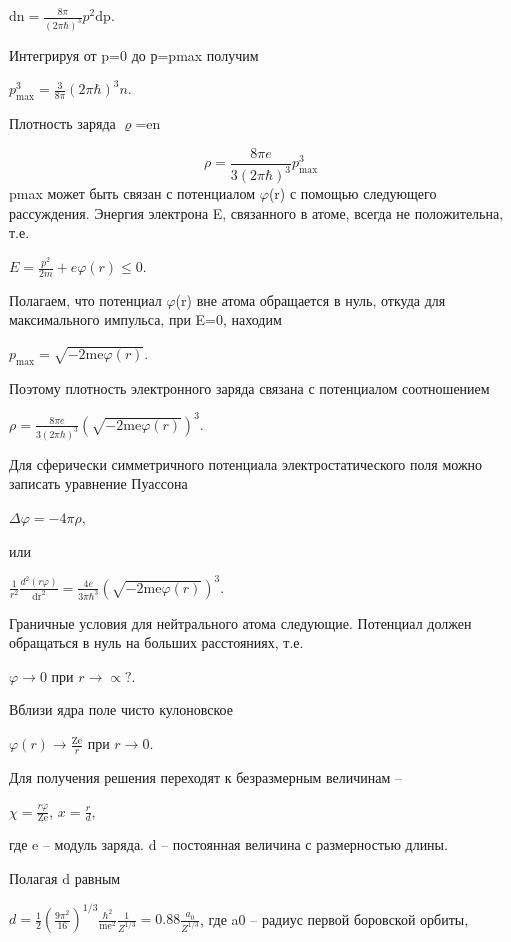 \documentclass[a4paper,14pt, openany, twoside, draft]{extbook} %
\begin{document}
 ${\text{dn}}=\frac{8\pi }{(2\pi \hbar )^3}p^2{\text{dp}}$.

Интегрируя от p=0 до р=pmax получим

 $p_{\text{max}}^3=\frac 3{8\pi }(2\pi \hbar )^3n$.

Плотность заряда ${\varrho}$=en

\begin{equation*}
\rho =\frac{8\mathit{\pi e}}{3(2\pi \hbar )^3}p_{\text{max}}^3
\end{equation*}
pmax может быть связан с потенциалом ${\varphi}$(r) с помощью следующего рассуждения. Энергия электрона E, связанного в атоме, всегда не положительна, т.е.

 $E=\frac{p^2}{2m}+\mathit{e\varphi }(r)\le 0$.

Полагаем, что потенциал ${\varphi}$(r) вне атома обращается в нуль, откуда для максимального импульса, при E=0, находим

 $p_{\text{max}}=\sqrt{-2{\text{me}}\varphi (r)}$.

Поэтому плотность электронного заряда связана с потенциалом соотношением

 $\rho =\frac{8\mathit{\pi e}}{3(2\pi \hbar )^3}\left(\sqrt{-2{\text{me}}\varphi (r)}\right)^3$.

Для сферически симметричного потенциала электростатического поля можно записать уравнение Пуассона

 $\Delta \varphi =-4\pi\rho$,

или

 $\frac 1{r^2}\frac{d^2(\mathit{r\varphi })}{{\text{dr}}^2}=\frac{4e}{3\pi \hbar ^3}\left(\sqrt{-2{\text{me}}\varphi (r)}\right)^3$.

Граничные условия для нейтрального атома следующие. Потенциал должен обращаться в нуль на больших расстояниях, т.е.

 $\varphi \rightarrow 0$ при  $r\rightarrow \propto ?$.

Вблизи ядра поле чисто кулоновское

 $\varphi (r)\rightarrow \frac{{\text{Ze}}} r$ при  $r\rightarrow 0$.

Для получения решения переходят к безразмерным величинам –

 $\chi =\frac{\mathit{r\varphi }}{{\text{Ze}}}$,  $x=\frac r d$,

где e – модуль заряда. d – постоянная величина с размерностью длины.

Полагая d равным

 $d=\frac 1 2\left(\frac{9\pi ^2}{16}\right)^{1/3}\frac{\hbar ^2}{{\text{me}}^2}\frac 1{Z^{1/3}}=0.88\frac{a_0}{Z^{1/3}}$, где a0 – радиус первой боровской орбиты,
\end{document}
